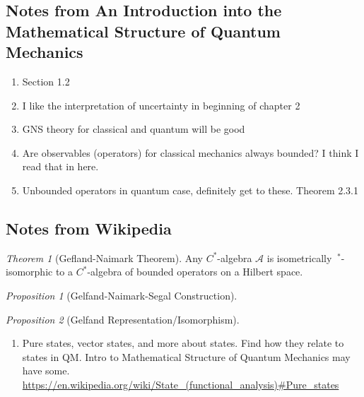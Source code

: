 \documentclass[leqno]{article}
\theoremstyle{definition}
\theoremstyle{remark}
\theoremstyle{theorem}
\newtheorem{theorem}{Theorem}[section]
\newtheorem{proposition}{Proposition}
\newcommand{\A}{\mathcal{A}}
\begin{document}
\color{blue}{left off on state in appendix (b) for notes}\color{black}

\subsection*{Notes from An Introduction into the Mathematical Structure of Quantum Mechanics}

\begin{enumerate}[1.]
\item Section 1.2
\item I like the interpretation of uncertainty in beginning of chapter 2
\item GNS theory for classical and quantum will be good
\item Are observables (operators) for classical mechanics always bounded? I think I read that in here.
\item Unbounded operators in quantum case, definitely get to these. Theorem 2.3.1
\end{enumerate}

\subsection*{Notes from Wikipedia}

\begin{theorem}[Gefland-Naimark Theorem]
Any $C^*$-algebra $\A$ is isometrically $~^*$-isomorphic to a $C^*$-algebra of bounded operators on a Hilbert space.
\end{theorem}

\begin{proposition}[Gelfand-Naimark-Segal Construction]


\end{proposition}

\begin{proposition}[Gelfand Representation/Isomorphism]

\end{proposition}

\begin{enumerate}[1.]
\item Pure states, vector states, and more about states.  Find how they relate to states in QM.  Intro to Mathematical Structure of Quantum Mechanics may have some. \url{https://en.wikipedia.org/wiki/State_(functional_analysis)#Pure_states}
\end{enumerate}



\pagebreak
\end{document}
